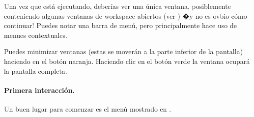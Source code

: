 \documentclass[a4paper,10pt,twoside]{book}
\begin{document}
Una vez que \pharo est\'a ejecutando, deber\'ias ver una \'unica ventana, posiblemente conteniendo algunas ventanas de workspace abiertos (ver ) �y no es ovbio c\'omo continuar!
Puedes notar una barra de men\'u, pero principalmente \pharo hace uso de menues contextuales.


Puedes minimizar ventanas (estas se mover\'an a la parte inferior de la pantalla) haciendo  en el bot\'on naranja. Haciendo clic en el bot\'on verde la ventana ocupar\'a la pantalla completa.

\paragraph{Primera interacci\'on.}

Un buen lugar para comenzar es el men\'u  mostrado en . 


\end{document}
